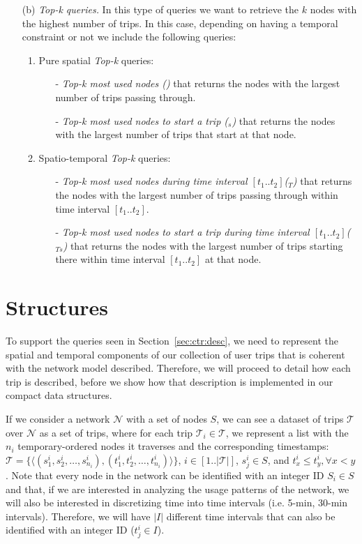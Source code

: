\begin{itemize}
		\item[(b)] {\em Top-k queries.} In this type of queries we want to retrieve the $k$ nodes with the highest number of trips. In this case, depending on having a temporal constraint or not we include the following queries:
		\begin{enumerate}
			\item Pure spatial {\em Top-k} queries:
			\begin{itemize}
				\item[-] {\em Top-k most used nodes (\topK)} that returns the nodes with the largest number of trips passing through.
				\item[-] {\em Top-k most used nodes to start a trip (\topK$_s$)} that returns the nodes with the largest number of trips that start at that node.
			\end{itemize}
			
			\item Spatio-temporal {\em Top-k}  queries:
			\begin{itemize}
				\item[-] {\em Top-k most used nodes during time interval $[t_1..t_2]$(\topK$_T$)} that returns the nodes with the largest number of trips passing through within time interval $[t_1..t_2]$. 
				\item[-] {\em Top-k most used nodes to start a trip during time interval $[t_1..t_2]$(\topK$_{Ts}$)} that returns the nodes with the largest number of trips starting there within time interval $[t_1..t_2]$ at that node.
			\end{itemize}
		\end{enumerate}
	\end{itemize}

\section{Structures}
\label{sec:ctr:str}
	To support the queries seen in Section~\ref{sec:ctr:desc}, we need to represent the spatial and temporal components of our collection of user trips that is coherent with the network model described. Therefore, we will proceed to detail how each trip is described, before we show how that description is implemented in our compact data structures.

	If we consider a network $\mathcal{N}$ with a set of nodes $S$, 
	we can see a dataset of trips $\mathcal{T}$ over $\mathcal{N}$ as 
	a set of trips, where for each trip $\mathcal{T}_i \in \mathcal{T}$, we represent a list with the 
	$n_i$
	temporary-ordered nodes it traverses and the corresponding timestamps: 
	$\mathcal{T}= \{ \langle (s^i_1, s^i_2, \dots,  s^i_{n_i}),(t^i_1, t^i_2, \dots,  t^i_{n_i}) \rangle\}$, $i\in[1..|\mathcal{T}|]$, 
	$s^i_j \in S$, and $t^i_{x} \leq t^i_y, \forall x < y$. 
	Note that every node in the network can be identified with an integer ID $S_i \in S$ and that, if we are interested in
	analyzing the usage patterns of the network, we will also be interested in discretizing time into 
	time intervals (i.e. 5-min, 30-min intervals). Therefore,
	we will have $|I|$ different time intervals that can also be identified with an
	integer ID ($t^i_j \in I$).

